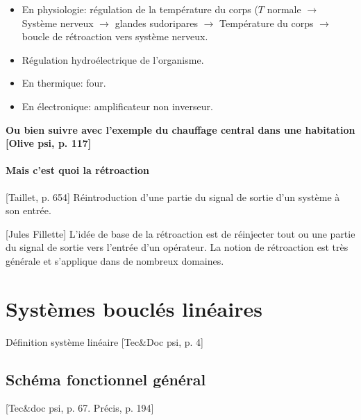 \documentclass[11pt]{report}
\numberwithin{figure}{section}
\numberwithin{equation}{section}
\numberwithin{table}{section}
\newcommand{\1}{\boldsymbol{1}}
\begin{document}
\begin{itemize}
\item En physiologie: régulation de la température du corps ($T$ normale $\rightarrow$ Système nerveux $\rightarrow$ glandes sudoripares $\rightarrow$ Température du corps $\rightarrow$ boucle de rétroaction vers système nerveux.
\item Régulation hydroélectrique de l'organisme.
\item En thermique: four.
\item En électronique: amplificateur non inverseur.
\end{itemize}

\textbf{Ou bien suivre avec l'exemple du chauffage central dans une habitation [Olive psi, p. 117]}

\paragraph{Mais c'est quoi la rétroaction} [Taillet, p. 654] Réintroduction d'une partie du signal de sortie d'un système à son entrée.

[Jules Fillette] L'idée de base de la rétroaction est de réinjecter tout ou une partie du signal de sortie vers l'entrée d'un opérateur. La notion de rétroaction est très générale et s'applique dans de nombreux domaines.





\section{Systèmes bouclés linéaires}

Définition système linéaire [Tec\&Doc psi, p. 4]

\subsection{Schéma fonctionnel général}

[Tec\&doc psi, p. 67. Précis, p. 194]
\end{document}
